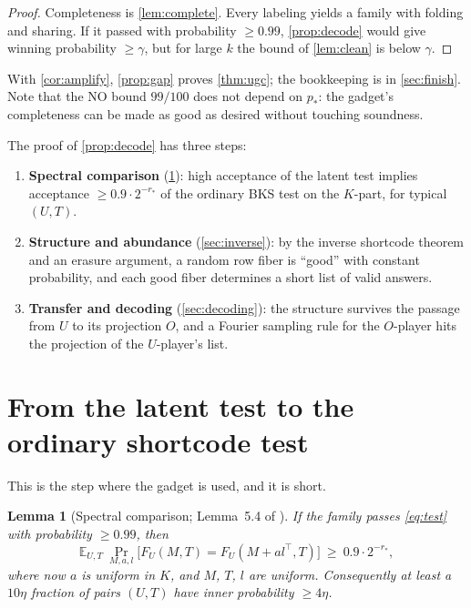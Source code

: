 \documentclass[11pt]{article}
\newtheorem{lemma}[theorem]{Lemma}
\theoremstyle{definition}
\theoremstyle{remark}
\newcommand{\E}{\mathbb E}
\begin{document}
\begin{proof}
Completeness is \cref{lem:complete}. Every labeling yields a family with
folding and sharing. If it passed with probability $\ge0.99$,
\cref{prop:decode} would give winning probability $\ge\gamma$, but for large
$k$ the bound of \cref{lem:clean} is below $\gamma$.
\end{proof}

With \cref{cor:amplify}, \cref{prop:gap} proves \cref{thm:ugc}; the bookkeeping
is in \cref{sec:finish}. Note that the NO bound $99/100$ does not depend on
$p_*$: the gadget's completeness can be made as good as desired without
touching soundness.

The proof of \cref{prop:decode} has three steps:
\begin{enumerate}
\item \textbf{Spectral comparison} (\cref{sec:spectral}): high acceptance of the
  latent test implies acceptance $\ge0.9\cdot2^{-r_*}$ of the ordinary BKS test
  on the $K$-part, for typical $(U,T)$.
\item \textbf{Structure and abundance} (\cref{sec:inverse}): by the inverse
  shortcode theorem and an erasure argument, a random row fiber is ``good''
  with constant probability, and each good fiber determines a short list of
  valid answers.
\item \textbf{Transfer and decoding} (\cref{sec:decoding}): the structure
  survives the passage from $U$ to its projection $O$, and a Fourier sampling
  rule for the $O$-player hits the projection of the $U$-player's list.
\end{enumerate}

\section{From the latent test to the ordinary shortcode test}\label{sec:spectral}

This is the step where the gadget is used, and it is short.

\begin{lemma}[Spectral comparison; Lemma~5.4 of \cite{OpenAI-UGC}]\label{lem:spectral}
If the family passes \eqref{eq:test} with probability $\ge0.99$, then
\[
\E_{U,T}\ \Pr_{M,a,l}\bigl[F_U(M,T)=F_U(M+al^\top,T)\bigr]\ \ge\ 0.9\cdot2^{-r_*},
\]
where now $a$ is uniform in $K$, and $M$, $T$, $l$ are uniform. Consequently at
least a $10\eta$ fraction of pairs $(U,T)$ have inner probability $\ge4\eta$.
\end{lemma}
\end{document}

